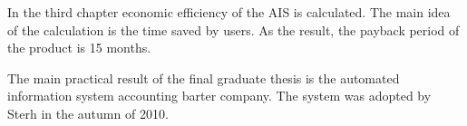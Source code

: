\documentclass[a4paper, 12pt]{article}
\begin{document}
In the third chapter economic efficiency of the AIS is calculated. The main idea of the calculation is the time saved by users. As the result, the payback period of the product is 15 months.


The main practical result of the final graduate thesis is the automated information system accounting barter company. The system was adopted by Sterh in the autumn of 2010.
\end{document}
